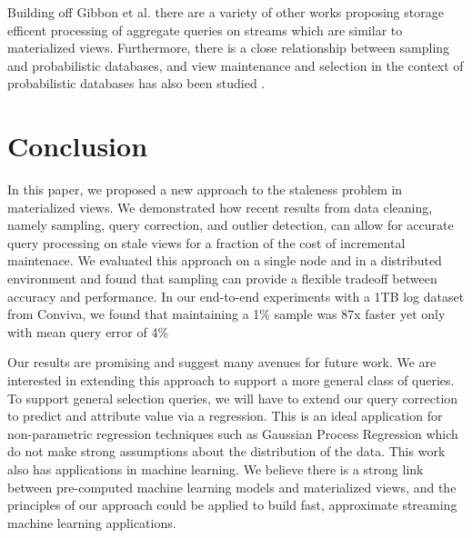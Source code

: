 Building off Gibbon et al. there are a variety of other works proposing storage efficent processing of aggregate queries on streams \cite{dobra2002processing, greenwald2001space} which are similar to materialized views. Furthermore, there is a close relationship between sampling and probabilistic databases, and view maintenance and selection in the context of probabilistic databases has also been studied \cite{re2007materialized}.

\section{Conclusion}
In this paper, we proposed a new approach to the staleness problem in materialized views.
We demonstrated how recent results from data cleaning, namely sampling, query correction, and outlier detection, can
allow for accurate query processing on stale views for a fraction of the cost of incremental maintenace.
We evaluated this approach on a single node and in a distributed environment and found that sampling can provide a flexible tradeoff 
between accuracy and performance.
In our end-to-end experiments with a 1TB log dataset from Conviva, we found that maintaining a 1\% sample was 87x faster yet only with mean query error of 4\%

Our results are promising and suggest many avenues for future work.
We are interested in extending this approach to support a more general class of queries.
To support general selection queries, we will have to extend our query correction to predict and attribute value via a regression.
This is an ideal application for non-parametric regression techniques such as Gaussian Process Regression which do
not make strong assumptions about the distribution of the data.
This work also has applications in machine learning.
We believe there is a strong link between pre-computed machine learning models and materialized views, and the principles of our approach could be applied
to build fast, approximate streaming machine learning applications.



